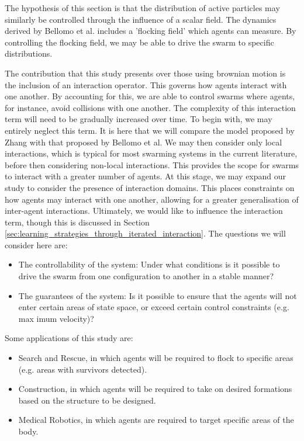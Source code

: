 \documentclass[.../main.tex]{subfiles}
\begin{document}
	The hypothesis of this section is that the distribution of active particles may
	similarly be controlled through the influence of a scalar field. The dynamics derived by Bellomo
	et al. \cite{Bellomo2017} includes a 'flocking field' which agents can measure. By controlling
	the flocking field, we may be able to drive the swarm to specific
	distributions. 

	The contribution that this study presents over those using brownian motion is the inclusion of an
	interaction operator. This governs how agents interact with one another. By accounting for this, we
	are able to control swarms where agents, for instance, avoid collisions with one another. The
	complexity of this interaction term will need to be gradually increased over time. To begin with,
	we may entirely neglect this term. It is here that we will compare the model proposed by Zhang with
	that proposed by Bellomo et al. We may then consider only local interactions, which is typical for
	most swarming systems in the current literature, before then considering non-local interactions.
	This provides the scope for swarms to interact with a greater number of agents. At this
	stage, we may expand our study to consider the presence of interaction domains. This places
	constraints on how agents may interact with one another, allowing for a greater generalisation of
	inter-agent interactions. Ultimately, we would like to influence the interaction term, though this
	is discussed in Section \ref{sec:learning_strategies_through_iterated_interaction}. The questions
	we will consider here are:

	\begin{itemize}
		\item The controllability of the system: Under what conditions is it possible to drive the
		swarm from one configuration to another in a stable manner?
		\item The guarantees of the system: Is it possible to ensure that the agents will not enter
		certain areas of state space, or exceed certain control constraints (e.g. max imum velocity)?
	\end{itemize}

	Some applications of this study are:

	\begin{itemize}
		\item Search and Rescue, in which agents will be required to flock to specific areas (e.g.
		areas with survivors detected).
		\item Construction, in which agents will be required to take on desired formations based on
		the structure to be designed.
		\item Medical Robotics, in which agents are required to target specific areas of the body.
	\end{itemize}
\end{document}
